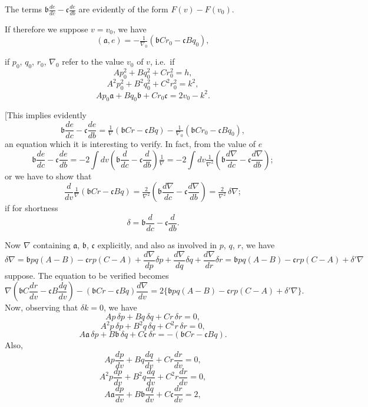 \documentclass[11pt]{article}
\begin{document}
The terms $\mathfrak{b}\frac{de}{dc} - \mathfrak{c}\frac{de}{db}$ are evidently of the form $F(v) - F(v_0)$.

If therefore we suppose $v = v_0$, we have
\[
(\mathfrak{a}, e) = -\tfrac{1}{\nabla_0}(\mathfrak{b}Cr_0 - \mathfrak{c}Bq_0), \tag{47}
\]

\newpage
\setcounter{page}{247}

if $p_0$, $q_0$, $r_0$, $\nabla_0$ refer to the value $v_0$ of $v$, i.e.\ if
\[
Ap_0^2 + Bq_0^2 + Cr_0^2 = h, \tag{48}
\]
\[
A^2p_0^2 + B^2q_0^2 + C^2r_0^2 = k^2,
\]
\[
A p_0 \mathfrak{a} + B q_0 \mathfrak{b} + C r_0 \mathfrak{c} = 2v_0 - k^2.
\]

[This implies evidently
\[
\mathfrak{b}\frac{de}{dc} - \mathfrak{c}\frac{de}{db} = \tfrac{1}{\nabla}(\mathfrak{b}Cr - \mathfrak{c}Bq) - \tfrac{1}{\nabla_0}(\mathfrak{b}Cr_0 - \mathfrak{c}Bq_0),
\]
an equation which it is interesting to verify. In fact, from the value of $e$
\[
\mathfrak{b}\frac{de}{dc} - \mathfrak{c}\frac{de}{db} = -2\!\int\!dv\left(\mathfrak{b}\frac{d}{dc} - \mathfrak{c}\frac{d}{db}\right)\tfrac{1}{\nabla} = -2\!\int\!dv\tfrac{1}{\nabla^2}\!\left(\mathfrak{b}\frac{d\nabla}{dc} - \mathfrak{c}\frac{d\nabla}{db}\right);
\]
or we have to show that
\[
\frac{d}{dv}\tfrac{1}{\nabla}(\mathfrak{b}Cr - \mathfrak{c}Bq) = \tfrac{2}{\nabla^2}\!\left(\mathfrak{b}\frac{d\nabla}{dc} - \mathfrak{c}\frac{d\nabla}{db}\right) = \tfrac{2}{\nabla^2}\,\delta\nabla;
\]
if for shortness
\[
\delta = \mathfrak{b}\frac{d}{dc} - \mathfrak{c}\frac{d}{db}.
\]

Now $\nabla$ containing $\mathfrak{a}$, $\mathfrak{b}$, $\mathfrak{c}$ explicitly, and also as involved in $p$, $q$, $r$, we have
\[
\delta\nabla = \mathfrak{b}pq(A - B) - \mathfrak{c}rp(C - A) + \frac{d\nabla}{dp}\delta p + \frac{d\nabla}{dq}\delta q + \frac{d\nabla}{dr}\delta r = \mathfrak{b}pq(A - B) - \mathfrak{c}rp(C - A) + \delta'\nabla
\]
suppose. The equation to be verified becomes
\[
\nabla\!\left(\mathfrak{b}C\frac{dr}{dv} - \mathfrak{c}B\frac{dq}{dv}\right) - (\mathfrak{b}Cr - \mathfrak{c}Bq)\frac{d\nabla}{dv} = 2\{\mathfrak{b}pq(A - B) - \mathfrak{c}rp(C - A) + \delta'\nabla\}.
\]
Now, observing that $\delta k = 0$, we have
\[
Ap\,\delta p + Bq\,\delta q + Cr\,\delta r = 0,
\]
\[
A^2p\,\delta p + B^2q\,\delta q + C^2r\,\delta r = 0,
\]
\[
A\mathfrak{a}\,\delta p + B\mathfrak{b}\,\delta q + C\mathfrak{c}\,\delta r = -(\mathfrak{b}Cr - \mathfrak{c}Bq).
\]
Also,
\[
Ap\frac{dp}{dv} + Bq\frac{dq}{dv} + Cr\frac{dr}{dv} = 0,
\]
\[
A^2p\frac{dp}{dv} + B^2q\frac{dq}{dv} + C^2r\frac{dr}{dv} = 0,
\]
\[
A\mathfrak{a}\frac{dp}{dv} + B\mathfrak{b}\frac{dq}{dv} + C\mathfrak{c}\frac{dr}{dv} = 2,
\]
\end{document}
